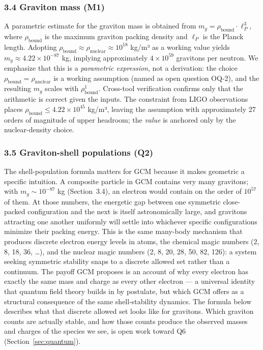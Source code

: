\documentclass[12pt]{article}
\theoremstyle{definition}
\theoremstyle{remark}
\begin{document}
\subsubsection{3.4 Graviton mass (M1)}\label{graviton-mass-m1}

A parametric estimate for the graviton mass is obtained from
\(m_g = \rho_{\text{bound}} \cdot \ell_P^3\), where
\(\rho_{\text{bound}}\) is the maximum graviton packing density and
\(\ell_P\) is the Planck length. Adopting
\(\rho_{\text{bound}} \approx \rho_{\text{nuclear}} \approx 10^{18}\)
kg/m³ as a working value yields \(m_g \approx 4.22 \times 10^{-87}\) kg,
implying approximately \(4 \times 10^{59}\) gravitons per neutron. We
emphasize that this is a \emph{parametric expression}, not a derivation:
the choice \(\rho_{\text{bound}} = \rho_{\text{nuclear}}\) is a working
assumption (named as open question OQ-2), and the resulting \(m_g\)
scales with \(\rho_{\text{bound}}^1\). Cross-tool verification confirms
only that the arithmetic is correct given the inputs. The constraint
from LIGO observations places
\(\rho_{\text{bound}} \leq 4.22 \times 10^{45}\) kg/m³, leaving the
assumption with approximately 27 orders of magnitude of upper headroom;
the \emph{value} is anchored only by the nuclear-density choice.

\subsubsection{3.5 Graviton-shell populations
(Q2)}\label{graviton-shell-populations-q2}

The shell-population formula matters for GCM because it makes geometric
a specific intuition. A composite particle in GCM contains very many
gravitons; with \(m_g \sim 10^{-87}\) kg (Section~3.4), an electron
would contain on the order of \(10^{57}\) of them. At those numbers, the
energetic gap between one symmetric close-packed configuration and the
next is itself astronomically large, and gravitons attracting one
another uniformly will settle into whichever specific configurations
minimize their packing energy. This is the same many-body mechanism that
produces discrete electron energy levels in atoms, the chemical magic
numbers (2, 8, 18, 36, \ldots), and the nuclear magic numbers (2, 8, 20,
28, 50, 82, 126): a system seeking symmetric stability snaps to a
discrete allowed set rather than a continuum. The payoff GCM proposes is
an account of why every electron has exactly the same mass and charge
as every other electron --- a universal identity that quantum field
theory builds in by postulate, but which GCM offers as a structural
consequence of the same shell-stability dynamics. The formula below
describes what that discrete allowed set looks like for gravitons. Which
graviton counts are actually stable, and how those counts produce the
observed masses and charges of the species we see, is open work toward
Q6 (Section~\ref{sec:quantum}).
\end{document}
